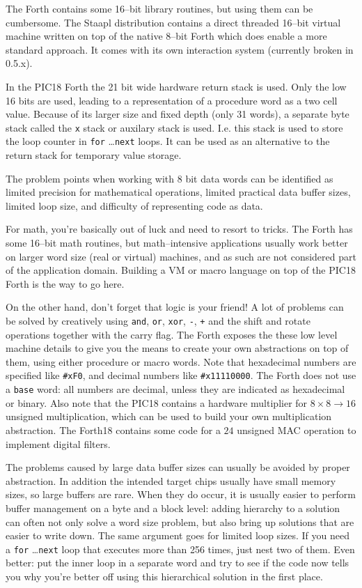 \documentclass[12pt]{article}
\begin{document}
The Forth contains some 16--bit library routines, but using them can
be cumbersome. The Staapl distribution contains a direct threaded
16--bit virtual machine written on top of the native 8--bit Forth
which does enable a more standard approach. It comes with its own
interaction system (currently broken in 0.5.x).

In the PIC18 Forth the 21 bit wide hardware return stack is used. Only
the low 16 bits are used, leading to a representation of a procedure
word as a two cell value. Because of its larger size and fixed depth
(only 31 words), a separate byte stack called the \verb|x| stack or
auxilary stack is used. I.e. this stack is used to store the loop
counter in \verb|for| \ldots \verb|next| loops. It can be used as an
alternative to the return stack for temporary value storage.

The problem points when working with 8 bit data words can be
identified as limited precision for mathematical operations, limited
practical data buffer sizes, limited loop size, and difficulty of
representing code as data.

For math, you're basically out of luck and need to resort to
tricks. The Forth has some 16--bit math routines, but math--intensive
applications usually work better on larger word size (real or virtual)
machines, and as such are not considered part of the application
domain. Building a VM or macro language on top of the PIC18 Forth is
the way to go here.

On the other hand, don't forget that logic is your friend! A lot of
problems can be solved by creatively using \verb|and|, \verb|or|,
\verb|xor|, \verb|-|, \verb|+| and the shift and rotate operations
together with the carry flag. The Forth exposes the these low level
machine details to give you the means to create your own abstractions
on top of them, using either procedure or macro words. Note that
hexadecimal numbers are specified like \verb|#xF0|, and decimal
numbers like \verb|#x11110000|. The Forth does not use a \verb|base| word:
all numbers are decimal, unless they are indicated as hexadecimal or
binary.  Also note that the PIC18 contains a hardware multiplier for
$8 \times 8 \to 16$ unsigned multiplication, which can be used to
build your own multiplication abstraction. The Forth18 contains some code
for a $24$ unsigned MAC operation to implement digital filters.

The problems caused by large data buffer sizes can usually be
avoided by proper abstraction. In addition the intended target chips
usually have small memory sizes, so large buffers are rare.  When they
do occur, it is usually easier to perform buffer management on a byte
and a block level: adding hierarchy to a solution can often not only
solve a word size problem, but also bring up solutions that are easier
to write down. The same argument goes for limited loop sizes. If you
need a \verb|for| \ldots \verb|next| loop that executes more than 256
times, just nest two of them. Even better: put the inner loop in a
separate word and try to see if the code now tells you why you're
better off using this hierarchical solution in the first place.
\end{document}
